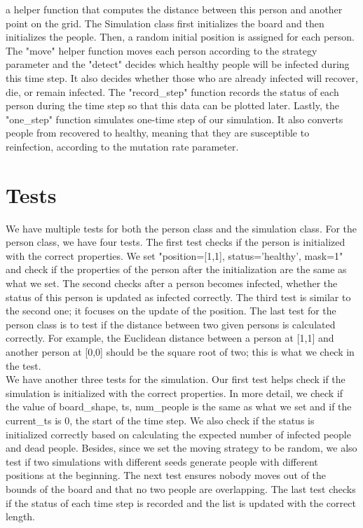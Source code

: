 \documentclass{article}
\begin{document}
a helper function that computes the distance between this person and another point on the grid. The Simulation class first initializes the board and then initializes the people. Then, a random initial position is assigned for each person. The "move" helper function moves each person according to the strategy parameter and the "detect" decides which healthy people will be infected during this time step. It also decides whether those who are already infected will recover, die, or remain infected. The "record\_step" function records the status of each person during the time step so that this data can be plotted later. Lastly, the "one\_step" function simulates one-time step of our simulation. It also converts people from recovered to healthy, meaning that they are susceptible to reinfection, according to the mutation rate parameter. 


\section{Tests}

We have multiple tests for both the person class and the simulation class. For the person class, we have four tests. The first test checks if the person is initialized with the correct properties. We set "position=[1,1], status='healthy', mask=1" and check if the properties of the person after the initialization are the same as what we set. The second checks after a person becomes infected, whether the status of this person is updated as infected correctly. The third test is similar to the second one; it focuses on the update of the position. The last test for the person class is to test if the distance between two given persons is calculated correctly. For example, the Euclidean distance between a person at [1,1] and another person at [0,0] should be the square root of two; this is what we check in the test. \\
\indent We have another three tests for the simulation. Our first test helps check if the simulation is initialized with the correct properties. In more detail, we check if the value of board\_shape, ts, num\_people is the same as what we set and if the current\_ts is 0, the start of the time step. We also check if the status is initialized correctly based on calculating the expected number of infected people and dead people. Besides, since we set the moving strategy to be random, we also test if two simulations with different seeds generate people with different positions at the beginning. The next test ensures nobody moves out of the bounds of the board and that no two people are overlapping. The last test checks if the status of each time step is recorded and the list is updated with the correct length.\\ 
\end{document}
